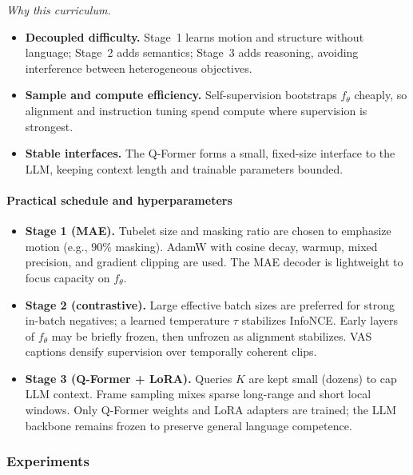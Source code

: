 \begin{enrichment}
\begin{enrichment}
        \noindent\textit{Why this curriculum.}
        \begin{itemize}
            \item \textbf{Decoupled difficulty.} Stage~1 learns motion and structure without language; Stage~2 adds semantics; Stage~3 adds reasoning, avoiding interference between heterogeneous objectives.
            \item \textbf{Sample and compute efficiency.} Self-supervision bootstraps $f_\theta$ cheaply, so alignment and instruction tuning spend compute where supervision is strongest.
            \item \textbf{Stable interfaces.} The Q-Former forms a small, fixed-size interface to the LLM, keeping context length and trainable parameters bounded.
        \end{itemize}
        
        \paragraph{Practical schedule and hyperparameters}
        \begin{itemize}
            \item \textbf{Stage 1 (MAE).} Tubelet size and masking ratio are chosen to emphasize motion (e.g., $90\%$ masking). AdamW with cosine decay, warmup, mixed precision, and gradient clipping are used. The MAE decoder is lightweight to focus capacity on $f_\theta$.
            \item \textbf{Stage 2 (contrastive).} Large effective batch sizes are preferred for strong in-batch negatives; a learned temperature $\tau$ stabilizes InfoNCE. Early layers of $f_\theta$ may be briefly frozen, then unfrozen as alignment stabilizes. VAS captions densify supervision over temporally coherent clips.
            \item \textbf{Stage 3 (Q-Former + LoRA).} Queries $K$ are kept small (dozens) to cap LLM context. Frame sampling mixes sparse long-range and short local windows. Only Q-Former weights and LoRA adapters are trained; the LLM backbone remains frozen to preserve general language competence.
        \end{itemize}
    
        \subsubsection{Experiments}
        

\end{enrichment}
\end{enrichment}
